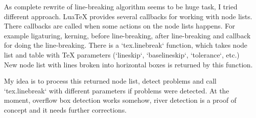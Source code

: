 \documentclass{ltxdoc}
\begin{document}
As complete rewrite of line-breaking algorithm seems to be huge task, I tried
different approach. LuaTeX provides several callbacks for working with node lists. 
There callbacks are called when some actions on the node lists happens. For
example ligaturing, kerning, before line-breaking, after line-breaking and
callback for doing the line-breaking. There is a `tex.linebreak` function, which takes
node list and table with TeX parameters (`lineskip`, `baselineskip`, `tolerance`,
etc.) New node list with lines broken into horizontal boxes is returned by this
function.

My idea is to process this returned node list, detect problems and call
`tex.linebreak` with different parameters if problems were detected. At the
moment, overflow box detection works somehow, river detection is a proof of
concept and it needs further corrections.
\end{document}
